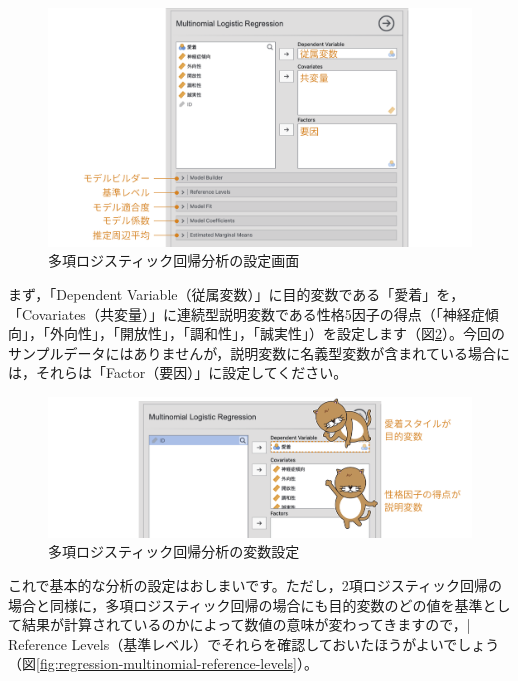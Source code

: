 \documentclass[
  12pt,
  a5jpaper,
  lualatex, ja=standard]{bxjsbook}
\begin{document}
\begin{figure}[!ht]

{\centering \includegraphics[width=1\linewidth]{images/regression/multinomial-setting} 

}

\caption{多項ロジスティック回帰分析の設定画面}\label{fig:regression-multinomial-setting}
\end{figure}

まず，「Dependent Variable（従属変数）」に目的変数である「愛着」を，「Covariates（共変量）」に連続型説明変数である性格5因子の得点（「神経症傾向」，「外向性」，「開放性」，「調和性」，「誠実性」）を設定します（図\ref{fig:regression-multinomial-set-variables}）。今回のサンプルデータにはありませんが，説明変数に名義型変数が含まれている場合には，それらは「Factor（要因）」に設定してください。

\begin{figure}[!ht]

{\centering \includegraphics[width=1\linewidth]{images/regression/multinomial-set-variables} 

}

\caption{多項ロジスティック回帰分析の変数設定}\label{fig:regression-multinomial-set-variables}
\end{figure}

これで基本的な分析の設定はおしまいです。ただし，2項ロジスティック回帰の場合と同様に，多項ロジスティック回帰の場合にも目的変数のどの値を基準として結果が計算されているのかによって数値の意味が変わってきますので，\colorbox{bar}{\textcolor{gmoji2}{| Reference Levels}}（基準レベル）でそれらを確認しておいたほうがよいでしょう（図\ref{fig:regression-multinomial-reference-levels}）。
\end{document}
